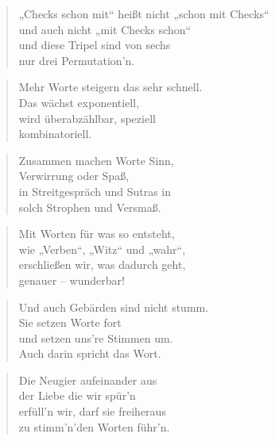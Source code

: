 \documentclass[10pt,a4paper]{article}
\begin{document}
\begin{paracol}{2}
\begin{verse}
„Checks schon mit“ heißt nicht „schon mit Checks“ \\
und auch nicht „mit Checks schon“ \\
und diese Tripel sind von sechs \\
nur drei Permutation’n. \\
\end{verse}

\begin{verse}
Mehr Worte steigern das sehr schnell. \\
Das wächst exponentiell, \\
wird überabzählbar, speziell \\
kombinatoriell. \\
\end{verse}

\begin{verse}
Zusammen machen Worte Sinn, \\
Verwirrung oder Spaß, \\
in Streitgespräch und Sutras in \\
solch Strophen und Versmaß. \\
\end{verse}

\begin{verse}
Mit Worten für was so entsteht, \\
wie „Verben“, „Witz“ und „wahr“, \\
erschließen wir, was dadurch geht, \\
genauer – wunderbar! \\
\end{verse}

\begin{verse}
Und auch Gebärden sind nicht stumm. \\
Sie setzen Worte fort \\
und setzen uns’re Stimmen um. \\
Auch darin spricht das Wort. \\
\end{verse}

\begin{verse}
Die Neugier aufeinander aus \\
der Liebe die wir spür’n \\
erfüll’n wir, darf sie freiheraus \\
zu stimm’n’den Worten führ’n. \\
\end{verse}


\end{paracol}
\end{document}
